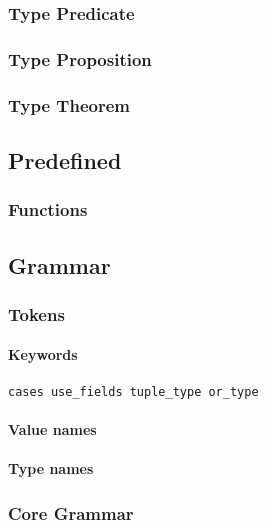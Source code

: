 \documentclass{article}
\begin{document}
\subsubsection{Type Predicate}

\subsubsection{Type Proposition}

\subsubsection{Type Theorem}

\subsection{Predefined}

\subsubsection{Functions}

\subsection{Grammar}
\subsubsection{Tokens}

\paragraph{Keywords}

\begin{verbatim}
cases use_fields tuple_type or_type
\end{verbatim}

\paragraph{Value names}

\paragraph{Type names}

\subsubsection{Core Grammar}
\end{document}
